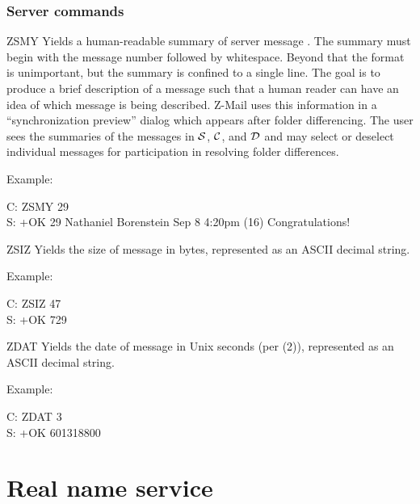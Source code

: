 \subsubsection{Server commands}

\begin{codelist}
\item[ZSMY \var{m}] Yields a human-readable summary of server message
.  The summary must begin with the message number followed by
whitespace.  Beyond that the format is unimportant, but the summary is
confined to a single line.  The goal is to produce a brief description
of a message such that a human reader can have an idea of which
message is being described.  Z-Mail uses this information in a
``synchronization preview'' dialog which appears after folder
differencing.  The user sees the summaries of the messages in
${\cal S}$, ${\cal C}$, and ${\cal D}$ and may select or
deselect individual messages for participation in resolving folder
differences.

Example:

\begin{conversation}
C: ZSMY 29 \\
S: +OK 29 Nathaniel Borenstein Sep 8 4:20pm (16) Congratulations!
\end{conversation}

\item[ZSIZ \var{m}] Yields the size of message  in bytes,
represented as an ASCII decimal string.

Example:

\begin{conversation}
C: ZSIZ 47 \\
S: +OK 729
\end{conversation}

\item[ZDAT \var{m}] Yields the date of message  in Unix seconds
(per (2)), represented as an ASCII decimal string.

Example:

\begin{conversation}
C: ZDAT 3 \\
S: +OK 601318800
\end{conversation}
\end{codelist}

\section{Real name service}

